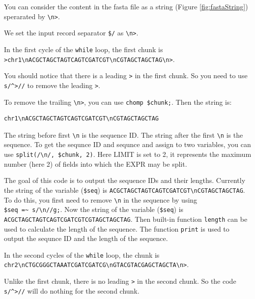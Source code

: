 \documentclass[]{book}
\theoremstyle{definition}
\theoremstyle{definition}
\theoremstyle{definition}
\theoremstyle{remark}
\begin{document}
You can consider the content in the fasta file as a string (Figure
\ref{fig:fastaString}) sperarated by
\texttt{\textbackslash{}n\textgreater{}}.

We set the input record separator \texttt{\$/} as
\texttt{\textbackslash{}n\textgreater{}}.

In the first cycle of the \texttt{while} loop, the first chunk is
\texttt{\textgreater{}chr1\textbackslash{}nACGCTAGCTAGTCAGTCGATCGT\textbackslash{}nCGTAGCTAGCTAG\textbackslash{}n\textgreater{}}.

You should notice that there is a leading \texttt{\textgreater{}} in the
first chunk. So you need to use \texttt{s/\^{}\textgreater{}//} to
remove the leading \texttt{\textgreater{}}.

To remove the trailing \texttt{\textbackslash{}n\textgreater{}}, you can
use \texttt{chomp\ \$chunk;}. Then the string is:

\begin{verbatim}
chr1\nACGCTAGCTAGTCAGTCGATCGT\nCGTAGCTAGCTAG
\end{verbatim}

The string before first \texttt{\textbackslash{}n} is the sequence ID.
The string after the first \texttt{\textbackslash{}n} is the sequence.
To get the sequnce ID and sequnce and assign to two variables, you can
use \texttt{split(/\textbackslash{}n/,\ \$chunk,\ 2)}. Here LIMIT is set
to 2, it represents the maximum number (here 2) of fields into which the
EXPR may be split.

The goal of this code is to output the sequence IDs and their lengths.
Currently the string of the variable (\texttt{\$seq}) is
\texttt{ACGCTAGCTAGTCAGTCGATCGT\textbackslash{}nCGTAGCTAGCTAG}. To do
this, you first need to remove \texttt{\textbackslash{}n} in the
sequence by using
\texttt{\$seq\ =\textasciitilde{}\ s/\textbackslash{}n//g;}. Now the
string of the variable (\texttt{\$seq}) is
\texttt{ACGCTAGCTAGTCAGTCGATCGTCGTAGCTAGCTAG}. Then built-in function
\texttt{length} can be used to calculate the length of the sequence. The
function \texttt{print} is used to output the sequnce ID and the length
of the sequence.

In the second cycles of the \texttt{while} loop, the chunk is
\texttt{chr2\textbackslash{}nCTGCGGGCTAAATCGATCGATCG\textbackslash{}nGTACGTACGAGCTAGCTA\textbackslash{}n\textgreater{}}.

Unlike the first chunk, there is no leading \texttt{\textgreater{}} in
the second chunk. So the code \texttt{s/\^{}\textgreater{}//} will do
nothing for the second chunk.
\end{document}
